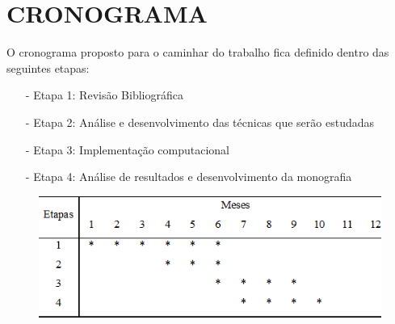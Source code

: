 \chapter{CRONOGRAMA}
\label{c.cronograma}

O cronograma proposto para o caminhar do trabalho fica definido dentro das seguintes etapas:
\begin{itemize}
	\item[-] Etapa 1: Revisão Bibliográfica
	\item[-] Etapa 2: Análise e desenvolvimento das técnicas que serão estudadas
	\item[-] Etapa 3: Implementação computacional
	\item[-] Etapa 4: Análise de resultados e desenvolvimento da monografia
\end{itemize}

\begin{figure}[h]
\centering
\includegraphics[scale=0.7]{figs/cronograma.png}
\label{f.cronograma}
\end{figure}





